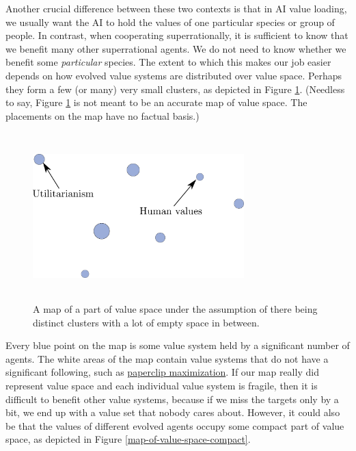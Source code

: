 Another crucial difference between these two contexts is that in AI
value loading, we usually want the AI to hold the values of one
particular species or group of people. In contrast, when cooperating
superrationally, it is sufficient to know that we benefit many other
superrational agents. We do not need to know whether we benefit some
\emph{particular} species. The extent to which this makes our job easier
depends on how evolved value systems are distributed over value space.
Perhaps they form a few (or many) very small clusters, as depicted in
Figure \ref{map-of-value-space-with-clusters}.
(Needless to say, Figure
\ref{map-of-value-space-with-clusters} is not meant to
be an accurate map of value space. The placements on the map have no
factual basis.)

\begin{figure}
    \centering
    \includegraphics[width=3.21875in,height=2.54167in]{figs/map-of-value-space-with-clusters}
    \caption{A map of a part of value
space under the assumption of there being distinct clusters with a lot
of empty space in between.}
    \label{map-of-value-space-with-clusters}
\end{figure}

Every blue point on the map is some value system held by a significant
number of agents. The white areas of the map contain value systems that
do not have a significant following, such as
\href{https://wiki.lesswrong.com/wiki/Paperclip_maximizer}{paperclip
maximization}. If our map really did represent value space and each
individual value system is fragile, then it is difficult to benefit
other value systems, because if we miss the targets only by a bit, we
end up with a value set that nobody cares about. However, it could also
be that the values of different evolved agents occupy some compact part
of value space, as depicted in Figure
\ref{map-of-value-space-compact}.


